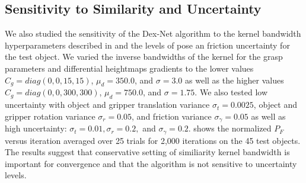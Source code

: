 \subsection{Sensitivity to Similarity and Uncertainty}
We also studied the sensitivity of the Dex-Net algorithm to the kernel bandwidth hyperparameters described in  and the levels of pose an friction uncertainty for the test object.
We varied the inverse bandwidths of the kernel for the grasp parameters and differential heightmaps gradients to the lower values $C_g = diag(0,0,15, 15)$, $\mu_d = 350.0$,  and $\sigma = 3.0$ as well as the higher values $C_g = diag(0,0,300, 300)$, $\mu_d = 750.0$,  and $\sigma = 1.75$.
We also tested low uncertainty with object and gripper translation variance $\sigma_{t} = 0.0025$, object and gripper rotation variance $\sigma_{r} = 0.05$, and friction variance $\sigma_{\gamma} = 0.05$ as well as high uncertainty: $\sigma_{t} = 0.01, \sigma_{r} = 0.2,$ and $\sigma_{\gamma} = 0.2$.
 shows the normalized $P_F$ versus iteration averaged over 25 trials for 2,000 iterations on the 45 test objects.
The results suggest that conservative setting of similiarity kernel bandwidth is important for convergence and that the algorithm is not sensitive to uncertainty levels.

